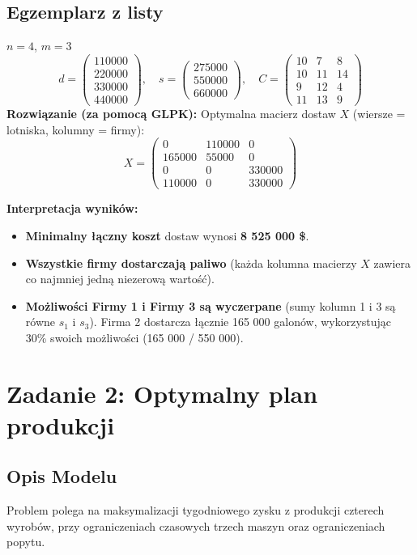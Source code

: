 \documentclass[11pt, a4paper]{article}
\begin{document}
\subsection{Egzemplarz z listy}
$n = 4$, $m = 3$
$$ d =
\begin{pmatrix}
110000 \\
220000 \\
330000 \\
440000
\end{pmatrix}, \quad s =
\begin{pmatrix}
275000 \\
550000 \\
660000
\end{pmatrix}, \quad C =
\begin{pmatrix}
10 & 7 & 8 \\
10 & 11 & 14 \\
9 & 12 & 4 \\
11 & 13 & 9
\end{pmatrix}
$$
\bigskip
\noindent \textbf{Rozwiązanie (za pomocą GLPK):}
Optymalna macierz dostaw $X$ (wiersze = lotniska, kolumny = firmy):
$$ X =
\begin{pmatrix}
0 & 110000 & 0 \\
165000 & 55000 & 0 \\
0 & 0 & 330000 \\
110000 & 0 & 330000
\end{pmatrix}
$$

\noindent \textbf{Interpretacja wyników:}
\begin{itemize}
    \item[ (a)] \textbf{Minimalny łączny koszt} dostaw wynosi \textbf{8 525 000 \$}.
    \item[ (b)] \textbf{Wszystkie firmy dostarczają paliwo} (każda kolumna macierzy $X$ zawiera co najmniej jedną niezerową wartość).
    \item[ (c)] \textbf{Możliwości Firmy 1 i Firmy 3 są wyczerpane} (sumy kolumn 1 i 3 są równe $s_1$ i $s_3$). Firma 2 dostarcza łącznie 165 000 galonów, wykorzystując 30\% swoich możliwości (165 000 / 550 000).
\end{itemize}


\section{Zadanie 2: Optymalny plan produkcji}

\subsection{Opis Modelu}
Problem polega na maksymalizacji tygodniowego zysku z produkcji czterech wyrobów, przy ograniczeniach czasowych trzech maszyn oraz ograniczeniach popytu.
\end{document}
